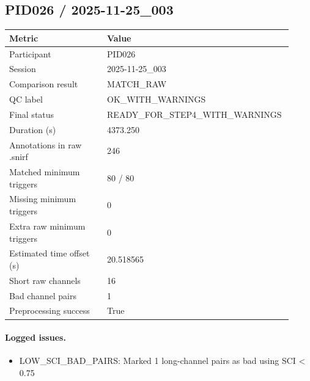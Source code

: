 \subsection*{PID026 / 2025-11-25\_003}
\begin{tabular}{p{0.34\linewidth}p{0.58\linewidth}}
\toprule
Metric & Value\\
\midrule
Participant & PID026\\
Session & 2025-11-25\_003\\
Comparison result & MATCH\_RAW\\
QC label & OK\_WITH\_WARNINGS\\
Final status & READY\_FOR\_STEP4\_WITH\_WARNINGS\\
Duration (s) & 4373.250\\
Annotations in raw .snirf & 246\\
Matched minimum triggers & 80 / 80\\
Missing minimum triggers & 0\\
Extra raw minimum triggers & 0\\
Estimated time offset (s) & 20.518565\\
Short raw channels & 16\\
Bad channel pairs & 1\\
Preprocessing success & True\\
\bottomrule
\end{tabular}
\paragraph{Logged issues.}
\begin{itemize}
\item [WARNING] LOW\_SCI\_BAD\_PAIRS: Marked 1 long-channel pairs as bad using SCI < 0.75
\end{itemize}
